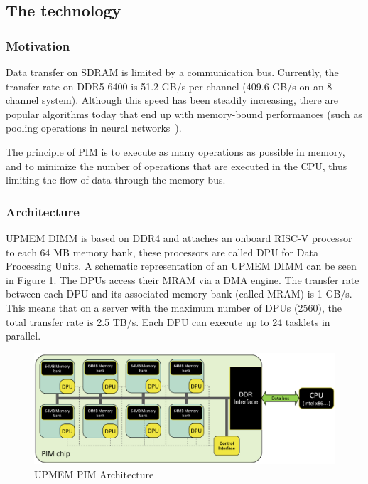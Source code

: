 \subsection{The technology}

\subsubsection{Motivation}

Data transfer on SDRAM is limited by a communication bus. Currently, the transfer rate on DDR5-6400 is 51.2 GB/s per channel (409.6 GB/s on an 8-channel system). Although this speed has been steadily increasing, there are popular algorithms today that end up with memory-bound performances (such as pooling operations in neural networks~\cite{nvidia.memory2020}).

The principle of PIM is to execute as many operations as possible in memory, and to minimize the number of operations that are executed in the CPU, thus limiting the flow of data through the memory bus.

\subsubsection{Architecture}

UPMEM DIMM is based on DDR4 and attaches an onboard RISC-V processor to each 64 MB memory bank, these processors are called DPU for Data Processing Units. A schematic representation of an UPMEM DIMM can be seen in Figure \ref{fig:DIMM}. The DPUs access their MRAM via a DMA engine. The transfer rate between each DPU and its associated memory bank (called MRAM) is 1 GB/s. This means that on a server with the maximum number of DPUs (2560), the total transfer rate is 2.5 TB/s. Each DPU can execute up to 24 tasklets in parallel.

\begin{figure}[htb]
    \centering
    \includegraphics[width=0.95\linewidth]{figures/PIM.pdf}
    \caption{\label{fig:DIMM}UPMEM PIM Architecture}
\end{figure}

